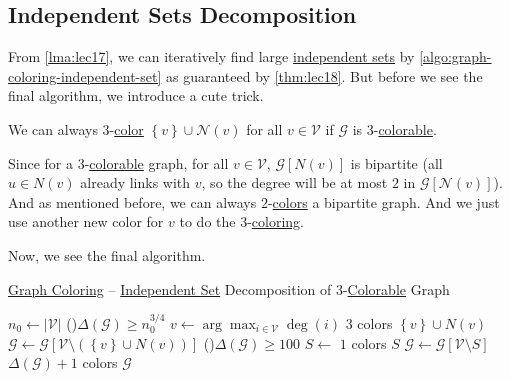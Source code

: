 \subsection{Independent Sets Decomposition}
From \autoref{lma:lec17}, we can iteratively find large \hyperref[def:independent-set]{independent sets} by \autoref{algo:graph-coloring-independent-set} as guaranteed by \autoref{thm:lec18}. But before we see the final algorithm, we introduce a cute trick.

\begin{remark}\label{rmk:Wigderson-trick}
	We can always \(3\)-\hyperref[def:coloring]{color} \(\left\{ v \right\} \cup \mathcal{N} (v)\) for all \(v\in \mathcal{V} \) if \(\mathcal{G} \) is \(3\)-\hyperref[def:coloring]{colorable}.
\end{remark}
\begin{explanation}
	Since for a \(3\)-\hyperref[def:coloring]{colorable} graph, for all \(v\in \mathcal{V} \), \(\mathcal{G} [N(v)]\) is bipartite (all \(u\in N(v)\) already links with \(v\), so the degree will be at most \(2\) in \(\mathcal{G} [\mathcal{N} (v)]\)). And as mentioned before, we can always \(2\)-\hyperref[def:coloring]{colors} a bipartite graph. And we just use another new color for \(v\) to do the \(3\)-\hyperref[def:coloring]{coloring}.
\end{explanation}

Now, we see the final algorithm.

\begin{algorithm}[H]\label{algo:graph-coloring}
	\DontPrintSemicolon
	\caption{\hyperref[prb:graph-coloring]{Graph Coloring} -- \hyperref[def:independent-set]{Independent Set} Decomposition of \(3\)-\hyperref[def:coloring]{Colorable} Graph}
	\BlankLine
	\(n_0\gets \left\vert \mathcal{V}  \right\vert \)\;
	\;
	\While(\label{algo:graph-coloring-phase-1}){\(\Delta (\mathcal{G} ) \geq n_0 ^{3 / 4}\)}{
	\(v\gets \arg\max _{i\in \mathcal{V} } \deg(i)\)\;
	\(3\) colors \(\left\{ v \right\} \cup N(v)\)
	\(\mathcal{G} \gets \mathcal{G} [\mathcal{V} \setminus (\left\{ v \right\} \cup N(v))]\)\;
	}
	\;
	\While(\label{algo:graph-coloring-phase-2}){\(\Delta (\mathcal{G} ) \geq 100\)}{
		\(S\gets\)
		\(1\) colors \(S\)\;
		\(\mathcal{G} \gets \mathcal{G} [\mathcal{V} \setminus S]\)\;
	}
	\;
	\(\Delta (\mathcal{G} ) + 1\) colors \(\mathcal{G} \)\label{algo:graph-coloring-phase-3}
	\;
\end{algorithm}

